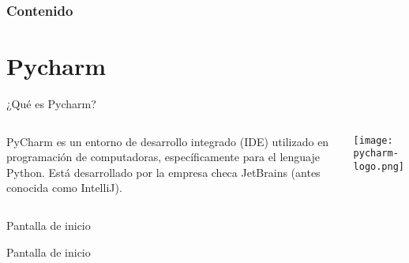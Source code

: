 \begin{frame}
    \frametitle{Contenido}
    \tableofcontents
\end{frame}

\section{Pycharm}

\begin{frame}[c]{¿Qué es Pycharm?}
    \begin{columns}
        PyCharm es un entorno de desarrollo integrado (IDE) utilizado en
        programación de computadoras, específicamente para el lenguaje Python.
        Está desarrollado por la empresa checa JetBrains (antes conocida como
        IntelliJ).
        \begin{center}
            \texttt{[image: pycharm-logo.png]}
        \end{center}
    \end{columns}
\end{frame}

\begin{frame}[c]{Pantalla de inicio}
    \begin{center}
        Pantalla de inicio
    \end{center}
\end{frame}
